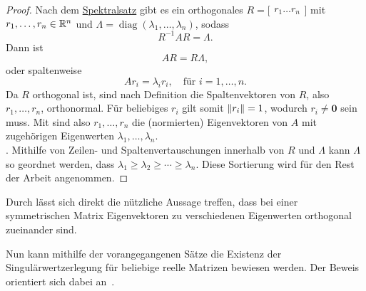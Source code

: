 \begin{proof}
    Nach dem \hyperref[spec]{Spektralsatz} gibt es ein orthogonales 
    \(
    R=
    \big[
    \begin{matrix}
        r_1 \dots r_n
    \end{matrix}
    \big]
    \)
    mit
    \(r_1,\ldots,r_n \in \mathbb{R}^{n}\) 
    und 
    \(\Lambda = \operatorname{diag}(\lambda_1,\ldots,\lambda_n)\), sodass
    \begin{equation*}
        R^{-1}AR = \Lambda.
    \end{equation*}
    Dann ist
    \begin{equation*}
        AR = R\Lambda, 
    \end{equation*} 
    oder spaltenweise
    \begin{equation*}
        Ar_i = {\lambda}_i r_i, \quad \text{für } i = 1,\ldots,n.
    \end{equation*}
    Da \(R\) orthogonal ist, sind nach Definition die Spaltenvektoren von \(R\), also \(r_1,\ldots,r_n\), orthonormal.
    Für beliebiges \(r_i\) gilt somit \(\lVert r_i\rVert = 1\), wodurch \(r_i \neq \symbf{0}\) sein muss.
    Mit  sind also \(r_1,\ldots,r_n\) die (normierten) Eigenvektoren von \(A\) mit zugehörigen Eigenwerten \(\lambda_1,\ldots,\lambda_n\).\vspace{6pt}\\
    . Mithilfe von Zeilen- und Spaltenvertauschungen innerhalb von \(R\) und \(\Lambda\) kann \(\Lambda\) so geordnet werden, dass \(\lambda_1 \geq \lambda_2 \geq \cdots \geq \lambda_n\).
Diese Sortierung wird für den Rest der Arbeit angenommen.
\end{proof}
\begin{remark}\label{rem:orth}
    Durch  lässt sich direkt die nützliche Aussage treffen, dass bei einer symmetrischen Matrix Eigenvektoren zu verschiedenen Eigenwerten orthogonal zueinander sind. 
\end{remark}
Nun kann mithilfe der vorangegangenen Sätze die Existenz der Singulärwertzerlegung für beliebige reelle Matrizen bewiesen werden.
Der Beweis orientiert sich dabei an~\cite{chenLecture5Singular2020}.

